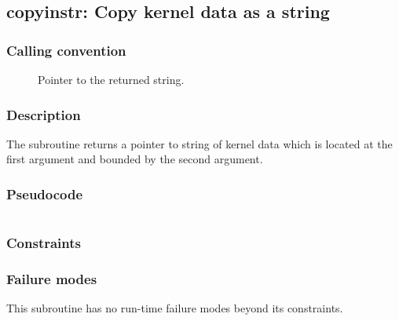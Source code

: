 \clearpage
{}
{}
\label{insn:dummy}
\subsection*{copyinstr: Copy kernel data as a string}

\subsubsection*{Calling convention}

\begin{description}
\item[] Pointer to the returned string.
\end{description}

\subsubsection*{Description}

The  subroutine returns a pointer to string of
kernel data which is located at the first argument and bounded by the
second argument.

\subsubsection*{Pseudocode}

\begin{verbatim}
\end{verbatim}

\subsubsection*{Constraints}

\subsubsection*{Failure modes}

This subroutine has no run-time failure modes beyond its constraints.
